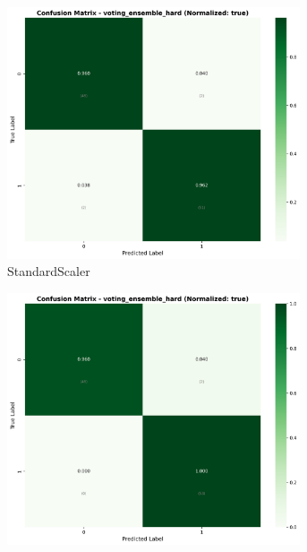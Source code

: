 \begin{figure}[H]\centering
\begin{subfigure}[b]{0.31\textwidth}\centering
\includegraphics[width=0.95\textwidth]{Result/heart_dataset/confusion_matrices/voting_ensemble_hard_numeric_dataset_StandardScaler.png}
\caption{StandardScaler}\label{fig:voting_heart_cm_standard}
\end{subfigure}\hfill
\begin{subfigure}[b]{0.31\textwidth}\centering
\includegraphics[width=0.95\textwidth]{Result/heart_dataset/confusion_matrices/voting_ensemble_hard_numeric_dataset_MinMaxScaler.png}

\end{subfigure}
\end{figure}
